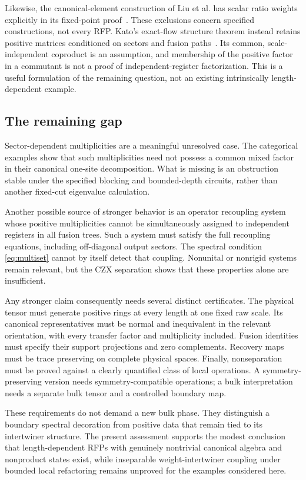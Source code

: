 Likewise, the canonical-element construction of Liu et al. has scalar
ratio weights explicitly in its fixed-point proof~\cite{Bialgebra}.
These exclusions concern specified constructions, not every RFP.
Kato's exact-flow structure theorem instead retains positive matrices
conditioned on sectors and fusion paths~\cite{Kato}. Its common,
scale-independent coproduct is an assumption, and membership of the
positive factor in a commutant is not a proof of independent-register
factorization. This is a useful formulation of the remaining question,
not an existing intrinsically length-dependent example.

\subsection{The remaining gap}

Sector-dependent multiplicities are a meaningful unresolved case.
The categorical examples show that such multiplicities need not
possess a common mixed factor in their canonical one-site
decomposition. What is missing is an obstruction stable under the
specified blocking and bounded-depth circuits, rather than another
fixed-cut eigenvalue calculation.

Another possible source of stronger behavior is an operator
recoupling system whose positive multiplicities cannot be
simultaneously assigned to independent registers in all fusion
trees. Such a system must satisfy the full recoupling equations,
including off-diagonal output sectors. The spectral condition
\cref{eq:multiset} cannot by itself detect that coupling. Nonunital
or nonrigid systems remain relevant, but the CZX separation shows
that these properties alone are insufficient.

Any stronger claim consequently needs several distinct certificates.
The physical tensor must generate positive rings at every length
at one fixed raw scale. Its canonical representatives must be
normal and inequivalent in the relevant orientation, with every
transfer factor and multiplicity included. Fusion identities must
specify their support projections and zero complements. Recovery
maps must be trace preserving on complete physical spaces. Finally,
nonseparation must be proved against a clearly quantified class of
local operations. A symmetry-preserving version needs
symmetry-compatible operations; a bulk interpretation needs a
separate bulk tensor and a controlled boundary map.

These requirements do not demand a new bulk phase. They distinguish
a boundary spectral decoration from positive data that remain tied
to its intertwiner structure. The present assessment supports the
modest conclusion that length-dependent RFPs with genuinely
nontrivial canonical algebra and nonproduct states exist, while
inseparable weight-intertwiner coupling under bounded local
refactoring remains unproved for the examples considered here.
